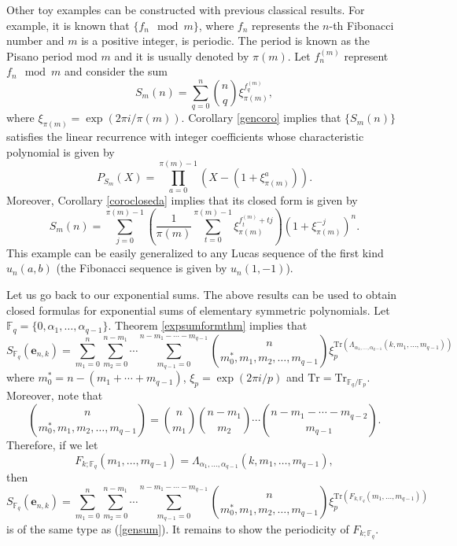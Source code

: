 \begin{example}
Other toy examples can be constructed with previous classical results.  For example, it is known that $\{f_n \mod m\}$, where $f_n$ represents the $n$-th Fibonacci number and $m$ is a positive integer, is 
periodic.  The period is known as the Pisano period mod $m$ and it is usually denoted by $\pi(m)$.  Let $f_n^{(m)}$ represent $f_n\mod m$ and consider the sum
\begin{equation}
 S_m(n)=\sum_{q=0}^n \binom{n}{q}\xi_{\pi(m)}^{f_q^{(m)}},
\end{equation}
where $\xi_{\pi(m)}=\exp(2\pi i/\pi(m))$.  Corollary \ref{gencoro} implies that $\{S_m(n)\}$ satisfies the linear recurrence with integer coefficients whose characteristic polynomial is given by
\begin{equation}
 P_{S_m}(X) = \prod_{a=0}^{\pi(m)-1} (X-(1+\xi_{\pi(m)}^a)).
\end{equation}
Moreover, Corollary \ref{corocloseda} implies that its closed form is given by
\begin{equation}
 S_m(n)=\sum_{j=0}^{\pi(m)-1} \left(\frac{1}{\pi(m)}\sum_{t=0}^{\pi(m)-1}\xi_{\pi(m)}^{f_t^{(m)}+tj}\right) \left(1+\xi_{\pi(m)}^{-j}\right)^n.
\end{equation}
This example can be easily generalized to any Lucas sequence of the first kind $u_n(a,b)$ (the Fibonacci sequence is given by $u_n(1,-1)$).
\end{example}



Let us go back to our exponential sums.  The above results can be used to obtain closed formulas for exponential sums of elementary symmetric polynomials.  Let $\mathbb{F}_q=\{0,\alpha_1,\ldots,\alpha_{q-1}\}$.  Theorem \ref{expsumformthm} implies that
\begin{equation}
 S_{\mathbb{F}_q}(\boldsymbol{e}_{n,k}) = \sum_{m_1=0}^n\sum_{m_2=0}^{n-m_1}\cdots\sum_{m_{q-1}=0}^{n-m_1-\cdots-m_{q-1}}{n\choose m_0^*,m_1,m_2,\ldots, m_{q-1}}\xi_p^{\text{Tr}
 \left(\Lambda_{\alpha_1,\ldots,\alpha_{q-1}}\left(k,m_1,\ldots,m_{q-1}\right)\right)}
\end{equation}
where $m_0^*=n-(m_1+\cdots+m_{q-1})$, $\xi_p=\exp(2\pi i/p)$ and $\text{Tr}=\text{Tr}_{\mathbb{F}_q/\mathbb{F}_p}$.  Moreover, note that
$${n\choose m_0^*,m_1,m_2,\ldots, m_{q-1}}=\binom{n}{m_1}\binom{n-m_1}{m_2}\cdots\binom{n-m_1-\cdots-m_{q-2}}{m_{q-1}}.$$
Therefore, if we let 
\begin{equation}
F_{k;\mathbb{F}_q}(m_1,\ldots,m_{q-1})=\Lambda_{\alpha_1,\ldots,\alpha_{q-1}}(k,m_1,\ldots, m_{q-1}),
\end{equation}
then
\begin{equation}
\label{goodtype}
S_{\mathbb{F}_q}(\boldsymbol{e}_{n,k}) = \sum_{m_1=0}^n\sum_{m_2=0}^{n-m_1}\cdots\sum_{m_{q-1}=0}^{n-m_1-\cdots-m_{q-1}}{n\choose m_0^*,m_1,m_2,\ldots, m_{q-1}}\xi_p^{\text{Tr}
\left(F_{k,\mathbb{F}_q}\left(m_1,\ldots,m_{q-1}\right)\right)}
\end{equation}
is of the same type as (\ref{gensum}).  It remains to show the periodicity of $F_{k;\mathbb{F}_q}$.

